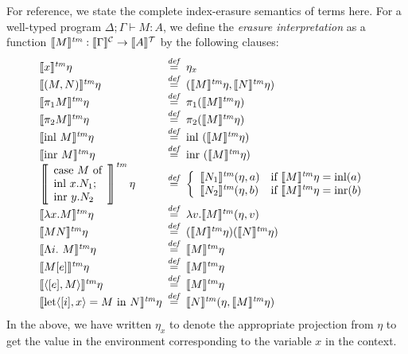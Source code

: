 For reference, we state the complete index-erasure semantics of terms
here. For a well-typed program $\Delta; \Gamma \vdash M : A$, we
define the \emph{erasure interpretation} as a function $\llbracket M \rrbracket^{\mathit{tm}} :
\llbracket \Gamma \rrbracket^{\mathcal{C}} \to \llbracket A \rrbracket^{\mathcal{T}}$ by the following clauses:
\begin{displaymath}
  \begin{array}{@{\hspace{0em}}l@{\hspace{0.5em}}c@{\hspace{0.5em}}l}
    \tmSem{x}\eta & \isDefinedAs & \eta_x \\
    \tmSem{(M,N)}\eta & \isDefinedAs & (\tmSem{M}\eta, \tmSem{N}\eta) \\
    \tmSem{\pi_1M}\eta & \isDefinedAs & \pi_1(\tmSem{M}\eta) \\
    \tmSem{\pi_2M}\eta & \isDefinedAs & \pi_2(\tmSem{M}\eta) \\
    \tmSem{\mathrm{inl}\ M}\eta & \isDefinedAs & \mathrm{inl}\ (\tmSem{M}\eta) \\
    \tmSem{\mathrm{inr}\ M}\eta & \isDefinedAs & \mathrm{inr}\ (\tmSem{M}\eta) \\
    \left\llbracket
      \begin{array}{l}
        \textrm{case}\ M\ \textrm{of}\\
        \textrm{inl}\ x.N_1;\\
        \textrm{inr}\ y.N_2
      \end{array}\right\rrbracket^{\mathit{tm}}\eta & \isDefinedAs &
    \left\{
      \begin{array}{ll}
        \tmSem{N_1}(\eta,a) & \textrm{if }\tmSem{M}\eta = \mathrm{inl}(a) \\
        \tmSem{N_2}(\eta,b) & \textrm{if }\tmSem{M}\eta = \mathrm{inr}(b)
      \end{array}
    \right. \\
    \tmSem{\lambda x. M}\eta & \isDefinedAs & \lambda v. \tmSem{M}(\eta, v) \\
    \tmSem{M N}\eta & \isDefinedAs & (\tmSem{M}\eta) (\tmSem{N}\eta) \\
    \tmSem{\Lambda i.\ M}\eta & \isDefinedAs & \tmSem{M}\eta \\
    \tmSem{M[e]}\eta & \isDefinedAs & \tmSem{M}\eta \\
    \tmSem{\langle[e], M\rangle}\eta & \isDefinedAs & \tmSem{M}\eta \\
    \tmSem{\mathrm{let}\langle[i], x\rangle = M\ \mathrm{in}\ N}\eta & \isDefinedAs & \tmSem{N}(\eta, \tmSem{M}\eta)
  \end{array}
\end{displaymath}
In the above, we have written $\eta_x$ to denote the appropriate
projection from $\eta$ to get the value in the environment
corresponding to the variable $x$ in the context.

